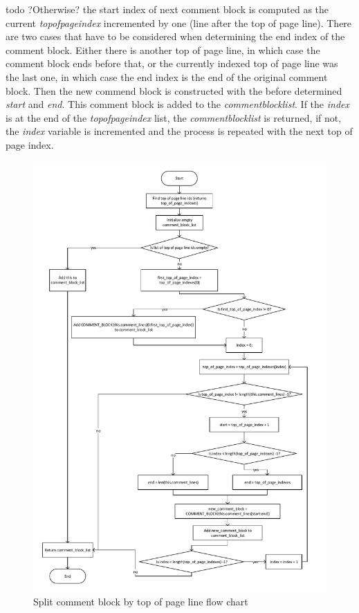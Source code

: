 todo ?Otherwise? the start index of next comment block is computed as the current \textit{top\textunderscore of\textunderscore page\textunderscore index} incremented by one (line after the top of page line).
There are two cases that have to be considered when determining the end index of the comment block.
Either there is another top of page line, in which case the comment block ends before that, or the currently indexed top of page line was the last one, in which case the end index is the end of the original comment block.
Then the new commend block is constructed with the before determined \textit{start} and \textit{end}.
This comment block is added to the \textit{comment\textunderscore block\textunderscore list}.
If the \textit{index} is at the end of the \textit{top\textunderscore of\textunderscore page\textunderscore index} list, the \textit{comment\textunderscore block\textunderscore list} is returned, if not, the \textit{index} variable is incremented and the process is repeated with the next top of page index.

\begin{figure}[H]
\centering
\includegraphics[width=1\textwidth]{images/Implementation_split_comment_by_top_of_page.pdf}
\caption{Split comment block by top of page line flow chart}
\label{fig:ImplementationMaintainingCommentSplitByTopOfPage}
\end{figure}

